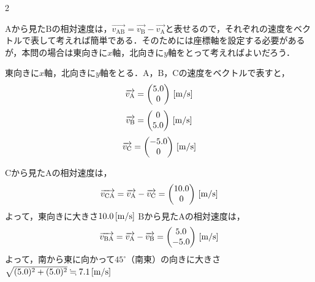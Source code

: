 \begin{multicols}{2}
\begin{sisin}
$\mathrm{A}$から見た$\mathrm{B}$の相対速度は，$\overrightarrow{v_{\mathrm{AB}}}=\overrightarrow{v_{\mathrm{B}}}-\overrightarrow{v_{\mathrm{A}}}$と表せるので，それぞれの速度をベクトルで表して考えれば簡単である．そのためには座標軸を設定する必要があるが，本問の場合は東向きに$x$軸，北向きに$y$軸をとって考えればよいだろう．
\end{sisin}
\KaiHead\par
\hspace{1zw}東向きに$x$軸，北向きに$y$軸をとる．$\mathrm{A}$，$\mathrm{B}$，$\mathrm{C}$の速度をベクトルで表すと，
\[\overrightarrow{v_{\mathrm{A}}}=\begin{pmatrix}5.0\\0\end{pmatrix}\,[\mathrm{m/s}]\]
\[\overrightarrow{v_{\mathrm{B}}}=\begin{pmatrix}0\\5.0\end{pmatrix}\,[\mathrm{m/s}]\]
\[\overrightarrow{v_{\mathrm{C}}}=\begin{pmatrix}-5.0\\0\end{pmatrix}\,[\mathrm{m/s}]\]
\begin{komon}
 $\mathrm{C}$から見た$\mathrm{A}$の相対速度は，
       \[\overrightarrow{v_{\mathrm{CA}}}=\overrightarrow{v_{\mathrm{A}}}-\overrightarrow{v_{\mathrm{C}}}=\begin{pmatrix}10.0\\0\end{pmatrix}\,[\mathrm{m/s}]\]
       よって，東向きに大きさ$10.0\,[\mathrm{m/s}]$\Ans
{} $\mathrm{B}$から見た$\mathrm{A}$の相対速度は，
       \[\overrightarrow{v_{\mathrm{BA}}}=\overrightarrow{v_{\mathrm{A}}}-\overrightarrow{v_{\mathrm{B}}}=\begin{pmatrix}5.0\\-5.0\end{pmatrix}\,[\mathrm{m/s}]\]
       よって，南から東に向かって$45^\circ$（南東）の向きに大きさ$\sqrt{(5.0)^2+(5.0)^2}\fallingdotseq 7.1\,[\mathrm{m/s}]$\Ans
\end{komon}


\end{multicols}
